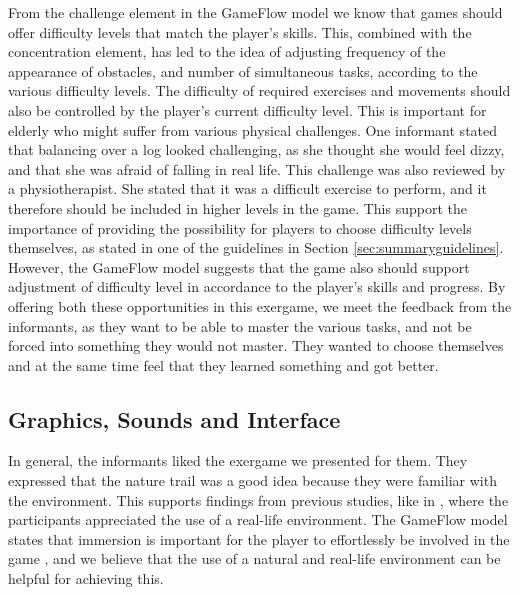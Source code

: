From the challenge element in the GameFlow model we know that games should offer difficulty levels that match the player's skills. This, combined with the concentration element, has led to the idea of adjusting frequency of the appearance of obstacles, and number of simultaneous tasks, according to the various difficulty levels. The difficulty of required exercises and movements should also be controlled by the player's current difficulty level. This is important for elderly who might suffer from various physical challenges. One informant stated that balancing over a log looked challenging, as she thought she would feel dizzy, and that she was afraid of falling in real life. This challenge was also reviewed by a physiotherapist. She stated that it was a difficult exercise to perform, and it therefore should be included in higher levels in the game. This support the importance of providing the possibility for players to choose difficulty levels themselves, as stated in one of the guidelines in Section \ref{sec:summaryguidelines}. However, the GameFlow model suggests that the game also should support adjustment of difficulty level in accordance to the player's skills and progress. By offering both these opportunities in this exergame, we meet the feedback from the informants, as they want to be able to master the various tasks, and not be forced into something they would not master. They wanted to choose themselves and at the same time feel that they learned something and got better.


\subsection{Graphics, Sounds and Interface}

In general, the informants liked the exergame we presented for them. They expressed that the nature trail was a good idea because they were familiar with the environment. This supports findings from previous studies, like in \cite{gerling2}, where the participants appreciated the use of a real-life environment. The GameFlow model states that immersion is important for the player to effortlessly be involved in the game \cite{sweetser}, and we believe that the use of a natural and real-life environment can be helpful for achieving this. 

